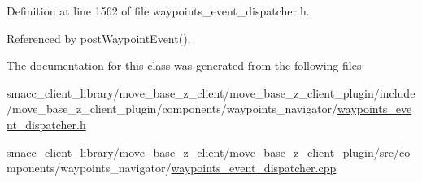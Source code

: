 Definition at line 1562 of file waypoints\+\_\+event\+\_\+dispatcher.\+h.



Referenced by post\+Waypoint\+Event().



The documentation for this class was generated from the following files\+:\begin{DoxyCompactItemize}
\item 
smacc\+\_\+client\+\_\+library/move\+\_\+base\+\_\+z\+\_\+client/move\+\_\+base\+\_\+z\+\_\+client\+\_\+plugin/include/move\+\_\+base\+\_\+z\+\_\+client\+\_\+plugin/components/waypoints\+\_\+navigator/\hyperlink{waypoints__event__dispatcher_8h}{waypoints\+\_\+event\+\_\+dispatcher.\+h}\item 
smacc\+\_\+client\+\_\+library/move\+\_\+base\+\_\+z\+\_\+client/move\+\_\+base\+\_\+z\+\_\+client\+\_\+plugin/src/components/waypoints\+\_\+navigator/\hyperlink{waypoints__event__dispatcher_8cpp}{waypoints\+\_\+event\+\_\+dispatcher.\+cpp}\end{DoxyCompactItemize}
